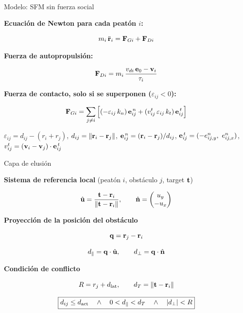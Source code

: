 
\begin{frame}{Modelo: SFM sin fuerza social}

\textbf{
Ecuación de Newton para cada peatón $i$:
}

\[
m_i\,\ddot{\mathbf{r}}_i =
\mathbf{F}_{Gi} + \mathbf{F}_{Di}
\]

\vspace{6pt}

\textbf{Fuerza de autopropulsión:}

\[
\mathbf{F}_{Di} =
m_i\,\frac{v_{di}\,\mathbf{e}_0 - \mathbf{v}_i}{\tau_i}
\]

\vspace{6pt}

\textbf{
Fuerza de contacto, solo si se superponen ($\varepsilon_{ij} < 0$):
}

\[
\mathbf{F}_{Gi} = \sum_{j\neq i}
\Big[
(-\varepsilon_{ij}\,k_n)\,\mathbf{e}^{\,n}_{ij}
+ (v^{t}_{ij}\,\varepsilon_{ij}\,k_t)\,\mathbf{e}^{\,t}_{ij}
\Big]
\]

{\small
$\varepsilon_{ij} = d_{ij} - (r_i + r_j)$,
\quad $d_{ij} = \|\mathbf{r}_i - \mathbf{r}_j\|$,
\quad $\mathbf{e}^{\,n}_{ij} = (\mathbf{r}_i - \mathbf{r}_j)/d_{ij}$,
\quad $\mathbf{e}^{\,t}_{ij} = (-e^{n}_{ij,y},\ e^{n}_{ij,x})$,
\quad $v^{t}_{ij} = (\mathbf{v}_i - \mathbf{v}_j)\cdot\mathbf{e}^{\,t}_{ij}$
}

\end{frame}



\begin{frame}{Capa de elusión}

\textbf{Sistema de referencia local} (peatón $i$, obstáculo $j$, target $\mathbf{t}$)

\[
\hat{\mathbf{u}} =
\frac{\mathbf{t}-\mathbf{r}_i}{\|\mathbf{t}-\mathbf{r}_i\|},
\qquad
\hat{\mathbf{n}} =
\begin{pmatrix}u_y\\-u_x\end{pmatrix}
\]

\textbf{Proyección de la posición del obstáculo}

\[
\mathbf{q}=\mathbf{r}_j-\mathbf{r}_i
\]

\[
d_{\parallel}=\mathbf{q}\cdot\hat{\mathbf{u}},
\qquad
d_{\perp}=\mathbf{q}\cdot\hat{\mathbf{n}}
\]

\textbf{Condición de conflicto}

\[
R=r_j+d_{\mathrm{lat}},
\qquad
d_T=\|\mathbf{t}-\mathbf{r}_i\|
\]

\[
\boxed{
d_{ij}\leq d_{\mathrm{act}}
\quad\land\quad
0<d_{\parallel}<d_T
\quad\land\quad
|d_{\perp}|<R
}
\]

\end{frame}

